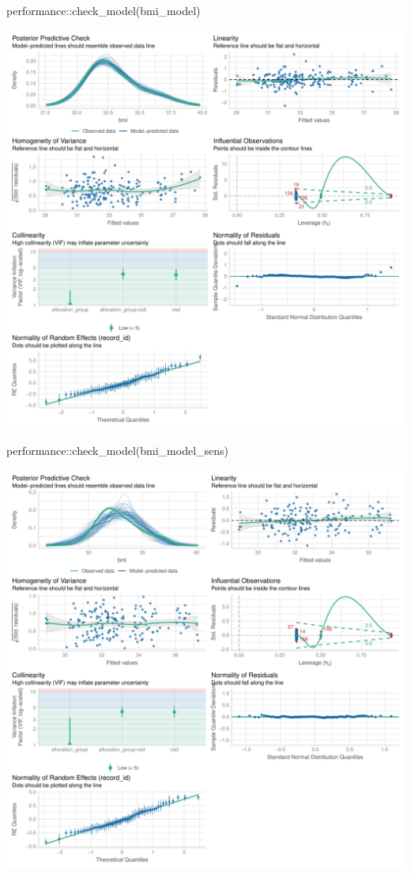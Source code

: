 \documentclass[
  letterpaper,
  DIV=11,
  numbers=noendperiod]{scrartcl}
\newenvironment{Shaded}{\begin{snugshade}}{\end{snugshade}}
\newcommand{\FunctionTok}[1]{\textcolor[rgb]{0.28,0.35,0.67}{#1}}
\newcommand{\NormalTok}[1]{\textcolor[rgb]{0.00,0.23,0.31}{#1}}
\newcommand{\SpecialCharTok}[1]{\textcolor[rgb]{0.37,0.37,0.37}{#1}}
\begin{document}
\begin{Shaded}
\begin{Highlighting}[]
\NormalTok{performance}\SpecialCharTok{::}\FunctionTok{check\_model}\NormalTok{(bmi\_model)}
\end{Highlighting}
\end{Shaded}

\includegraphics{Outcomes_V1V2V3_files/figure-pdf/bmi_4-1.pdf}

\begin{Shaded}
\begin{Highlighting}[]
\NormalTok{performance}\SpecialCharTok{::}\FunctionTok{check\_model}\NormalTok{(bmi\_model\_sens)}
\end{Highlighting}
\end{Shaded}

\includegraphics{Outcomes_V1V2V3_files/figure-pdf/bmi_4-2.pdf}
\end{document}
